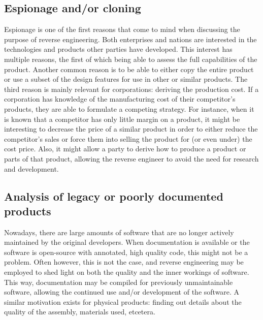 \documentclass{llncs}
\begin{document}
\subsection{Espionage and/or cloning}
Espionage is one of the first reasons that come to mind when discussing the purpose of reverse engineering. Both enterprises and nations are interested in the technologies and products other parties have developed. This interest has multiple reasons, the first of which being able to assess the full capabilities of the product. Another common reason is to be able to either copy the entire product or use a subset of the design features for use in other or similar products. The third reason is mainly relevant for corporations: deriving the production cost. If a corporation has knowledge of the manufacturing cost of their competitor's products, they are able to formulate a competing strategy. For instance, when it is known that a competitor has only little margin on a product, it might be interesting to decrease the price of a similar product in order to either reduce the competitor's sales or force them into selling the product for (or even under) the cost price\cite{doc:stateoftheartIC}. Also, it might allow a party to derive how to produce a product or parts of that product, allowing the reverse engineer to avoid the need for research and development. 

\subsection{Analysis of legacy or poorly documented products}
Nowadays, there are large amounts of software that are no longer actively maintained by the original developers. When documentation is available or the software is open-source with annotated, high quality code, this might not be a problem. Often however, this is not the case, and reverse engineering may be employed to shed light on both the quality and the inner workings of software. This way, documentation may be compiled for previously unmaintainable software, allowing the continued use and/or development of the software. A similar motivation exists for physical products: finding out details about the quality of the assembly, materials used, etcetera\cite{web:altertech}. 
\end{document}
